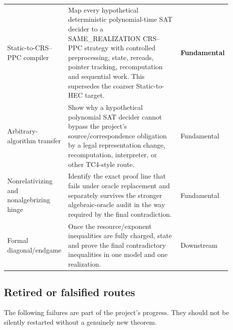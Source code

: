 \documentclass[11pt]{article}
\begin{document}
\begin{longtable}{>{\raggedright\arraybackslash}p{0.24\linewidth}
                  >{\raggedright\arraybackslash}p{0.53\linewidth}
                  >{\raggedright\arraybackslash}p{0.15\linewidth}}
Static-to-CRS--PPC compiler &
Map every hypothetical deterministic polynomial-time SAT decider to a SAME_REALIZATION CRS--PPC
strategy with controlled preprocessing, state, rereads, pointer tracking, recomputation and
sequential work. This supersedes the coarser Static-to-HEC target. &
\textbf{Fundamental}\\
Arbitrary-algorithm transfer &
Show why a hypothetical polynomial SAT decider cannot bypass the project's source/correspondence
obligation by a legal representation change, recomputation, interpreter, or other TC4-style route. &
Fundamental\\

Nonrelativizing and nonalgebrizing hinge &
Identify the exact proof line that fails under oracle replacement and separately survives the stronger
algebraic-oracle audit in the way required by the final contradiction. &
Fundamental\\

Formal diagonal/endgame &
Once the resource/exponent inequalities are fully charged, state and prove the final contradictory
inequalities in one model and one realization. &
Downstream\\

\bottomrule
\end{longtable}

\subsection{Retired or falsified routes}

\begin{warningbox}
The following failures are part of the project's progress. They should not be silently restarted
without a genuinely new theorem.
\end{warningbox}
\end{document}
